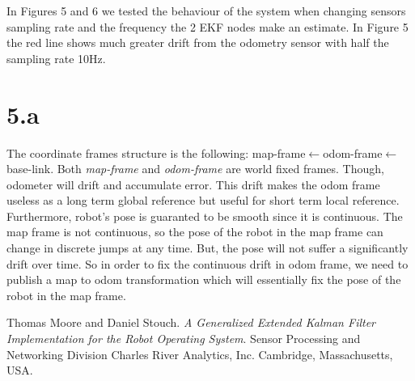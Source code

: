 \documentclass[10pt,a4paper,twocolumn]{article}
\begin{document}
In Figures 5 and 6 we tested the behaviour of the system when changing sensors sampling rate and the frequency the 2 EKF nodes make an estimate. In Figure 5 the red line shows much greater drift from the odometry sensor with half the sampling rate 10Hz.


\section{5.a}

The coordinate frames structure is the following: 
map-frame$\leftarrow$odom-frame$\leftarrow$base-link. Both \textit{map-frame} and \textit{odom-frame} are world fixed frames. Though, odometer will drift and accumulate error. This drift makes the odom frame useless as a long term global reference but useful for short term local reference. Furthermore, robot's pose is guaranted to be smooth since it is continuous. The map frame is not continuous, so the pose of the robot in the map frame can change in discrete jumps at any time. But, the pose will not suffer a significantly drift over time. So in order to fix the continuous drift in odom frame, we need to publish a map to odom transformation which will essentially fix the pose of the robot in the map frame.

\begin{thebibliography}{9}
	Thomas Moore and Daniel Stouch. 
	\textit{A Generalized Extended Kalman Filter Implementation for the Robot Operating System}. 
	Sensor Processing and Networking Division Charles River Analytics, Inc. Cambridge, Massachusetts, USA.	
	
	
\end{thebibliography}


	
\end{document}
